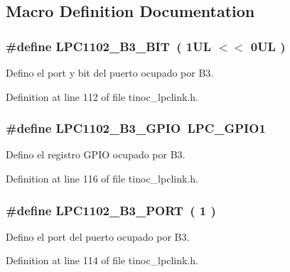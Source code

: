 \subsection{Macro Definition Documentation}
\subsubsection[{\texorpdfstring{L\+P\+C1102\+\_\+\+B3\+\_\+\+B\+IT}{LPC1102_B3_BIT}}]{\setlength{\rightskip}{0pt plus 5cm}\#define L\+P\+C1102\+\_\+\+B3\+\_\+\+B\+IT~( 1\+U\+L $<$$<$ 0\+U\+L )}\hypertarget{group___p_i_n_b3_ga39bcaf57d33e1054d42f18cdb09ee3f3}{}\label{group___p_i_n_b3_ga39bcaf57d33e1054d42f18cdb09ee3f3}


Defino el port y bit del puerto ocupado por B3. 



Definition at line 112 of file tinoc\+\_\+lpclink.\+h.

\subsubsection[{\texorpdfstring{L\+P\+C1102\+\_\+\+B3\+\_\+\+G\+P\+IO}{LPC1102_B3_GPIO}}]{\setlength{\rightskip}{0pt plus 5cm}\#define L\+P\+C1102\+\_\+\+B3\+\_\+\+G\+P\+IO~L\+P\+C\+\_\+\+G\+P\+I\+O1}\hypertarget{group___p_i_n_b3_gab894d5a6e82d3bb1548150fa1f903c84}{}\label{group___p_i_n_b3_gab894d5a6e82d3bb1548150fa1f903c84}


Defino el registro G\+P\+IO ocupado por B3. 



Definition at line 116 of file tinoc\+\_\+lpclink.\+h.

\subsubsection[{\texorpdfstring{L\+P\+C1102\+\_\+\+B3\+\_\+\+P\+O\+RT}{LPC1102_B3_PORT}}]{\setlength{\rightskip}{0pt plus 5cm}\#define L\+P\+C1102\+\_\+\+B3\+\_\+\+P\+O\+RT~( 1 )}\hypertarget{group___p_i_n_b3_ga2d2cd4b200ff348a009d8893cbeefaf8}{}\label{group___p_i_n_b3_ga2d2cd4b200ff348a009d8893cbeefaf8}


Defino el port del puerto ocupado por B3. 



Definition at line 114 of file tinoc\+\_\+lpclink.\+h.

